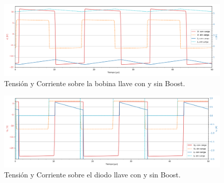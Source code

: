 \begin{multicols}{2}
\begin{figure}[H]
	\centering
	\includegraphics[width=\linewidth]{ImagenesEjercicio-3/il-vl-1v3}
	\caption{Tensión y Corriente sobre la bobina llave con y sin Boost.}
	\label{fig:ej3:Il_Vl_SWITCH_BOOST}
\end{figure}
\begin{figure}[H]
	\centering
	\includegraphics[width=\linewidth]{ImagenesEjercicio-3/id-vd-1v3}
	\caption{Tensión y Corriente sobre el diodo llave con y sin Boost.}
	\label{fig:ej3:Id_Vd_SWITCH_BOOST}
\end{figure}
\end{multicols}

